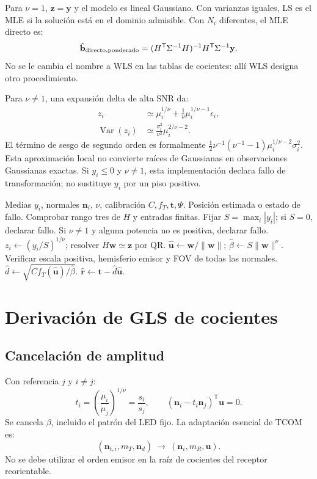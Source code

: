 \documentclass[11pt,a4paper]{article}
\begin{document}
Para $\nu=1$, $\mathbf z=\mathbf y$ y el modelo es lineal Gaussiano. Con varianzas iguales, LS es el MLE si la solución está en el dominio admisible. Con $N_i$ diferentes, el MLE directo es:
\begin{equation}
 \hat{\mathbf b}_{\rm directo,ponderado}
 =(H^{\mathsf T}\Sigma^{-1}H)^{-1}H^{\mathsf T}\Sigma^{-1}\mathbf y.
\end{equation}
No se le cambia el nombre a WLS en las tablas de cocientes: allí WLS designa otro procedimiento.

Para $\nu\ne1$, una expansión delta de alta SNR da:
\begin{align}
 z_i&\simeq\mu_i^{1/\nu}+\frac1\nu\mu_i^{1/\nu-1}\epsilon_i,\\
 \operatorname{Var}(z_i)&\simeq\frac{\sigma_i^2}{\nu^2}\mu_i^{2/\nu-2}.
\end{align}
El término de sesgo de segundo orden es formalmente
$\tfrac12\nu^{-1}(\nu^{-1}-1)\mu_i^{1/\nu-2}\sigma_i^2$.
Esta aproximación local no convierte raíces de Gaussianas en observaciones Gaussianas exactas. Si $y_i\leq0$ y $\nu\ne1$, esta implementación declara fallo de transformación; no sustituye $y_i$ por un piso positivo.

\begin{algorithm}[htbp]\caption{LS directo y posición 3D}\begin{algorithmic}[1]
\Require Medias $y_i$, normales $\mathbf n_i$, $\nu$, calibración $C,f_T,\mathbf t,\Psi$.
\Ensure Posición estimada o estado de fallo.
\State Comprobar rango tres de $H$ y entradas finitas.
\State Fijar $S=\max_i|y_i|$; si $S=0$, declarar fallo.
\State Si $\nu\ne1$ y alguna potencia no es positiva, declarar fallo.
\State $z_i\gets(y_i/S)^{1/\nu}$; resolver $H\mathbf w\simeq\mathbf z$ por QR.
\State $\hat{\mathbf u}\gets\mathbf w/\|\mathbf w\|$; $\hat\beta\gets S\|\mathbf w\|^\nu$.
\State Verificar escala positiva, hemisferio emisor y FOV de todas las normales.
\State $\hat d\gets\sqrt{Cf_T(\hat{\mathbf u})/\hat\beta}$.
\State \Return $\hat{\mathbf r}\gets\mathbf t-\hat d\hat{\mathbf u}$.
\end{algorithmic}\end{algorithm}

\section{Derivación de GLS de cocientes}
\subsection{Cancelación de amplitud}
Con referencia $j$ y $i\ne j$:
\begin{equation}
 t_i=\left(\frac{\mu_i}{\mu_j}\right)^{1/\nu}=\frac{s_i}{s_j},\qquad
 (\mathbf n_i-t_i\mathbf n_j)^{\mathsf T}\mathbf u=0.
\end{equation}
Se cancela $\beta$, incluido el patrón del LED fijo. La adaptación esencial de TCOM es:
\begin{equation}
 (\mathbf n_{t,i},m_T,\mathbf n_d)\ \longrightarrow\ (\mathbf n_i,m_R,\mathbf u).
\end{equation}
No se debe utilizar el orden emisor en la raíz de cocientes del receptor reorientable.
\end{document}
